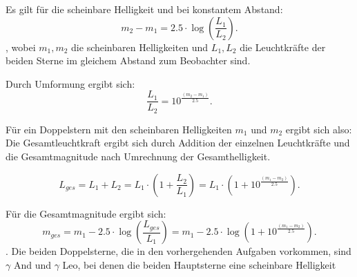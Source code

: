Es gilt für die scheinbare Helligkeit und bei konstantem Abstand: 
\begin{equation}
m_2 - m_1 = 2.5\cdot \log(\frac{L_1}{L_2}). 
\end{equation}, 
wobei $m_1, m_2$ die scheinbaren Helligkeiten und $L_1, L_2$  die Leuchtkräfte der beiden Sterne im gleichem Abstand zum Beobachter sind.

Durch Umformung ergibt sich: 
\begin{equation}
\frac{L_1}{L_2} = 10^{\frac{(m_2 - m_1)}{2.5}}. 
\end{equation}

Für ein Doppelstern mit den scheinbaren Helligkeiten $m_1$ und $m_2$ ergibt sich also: 
Die Gesamtleuchtkraft ergibt sich durch Addition der einzelnen Leuchtkräfte und die Gesamtmagnitude nach Umrechnung der Gesamthelligkeit. 

\begin{equation}
L_{ges} = L_1 + L_2 = L_1 \cdot (1 + \frac{L_2}{L_1}) = L_1 \cdot (1 + 10^{\frac{(m_1 - m_2)}{2.5}}). 
\end{equation}

Für die Gesamtmagnitude ergibt sich:
\begin{equation}
m_{ges} = m_1 - 2.5\cdot \log(\frac{L_{ges}}{L_1}) = m_1 - 2.5\cdot \log(1 + 10^{\frac{(m_1 - m_2)}{2.5}}).
\end{equation}. 
Die beiden Doppelsterne, die in den vorhergehenden Aufgaben vorkommen, sind $\gamma$ And und $\gamma$ Leo, bei denen die beiden Hauptsterne eine scheinbare Helligkeit 